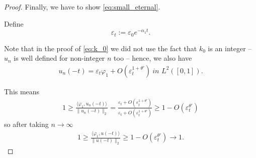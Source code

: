 \documentclass{article}
\newcommand{\1}[1]{{\mathds{1}}_{\left\{#1\right\}}}
\begin{document}
\begin{proof}
	Finally, we have to show \eqref{eq:small_eternal}. 
	
	Define
	$$\varepsilon_t:=\varepsilon_0e^{-\alpha_1 t}. $$
	
	Note that in the proof of \eqref{eq:k_0} we did not use the fact that $k_0$ is an integer -- $u_n$ is well defined for non-integer $n$ too -- hence, we also have
	\begin{align*}
		u_n(-t)=\varepsilon_t \varphi_1+O \left(\varepsilon_t^{1+\theta'} \right)  \ \textit {in } L^2([0,1]).
	\end{align*}

	This means
	\begin{align*}
		1 \geq \frac{\langle \varphi_1, u_n(-t) \rangle}{\|u_n(-t) \|_2}=\frac{\varepsilon_t+O \left(\varepsilon_t^{1+\theta'} \right)}{\varepsilon_t+O \left(\varepsilon_t^{1+\theta'} \right)} \geq 1-O \left(\varepsilon_{t}^{\theta'} \right)
	\end{align*}
	so after taking $n \to \infty$
	\begin{align*}
			1 \geq \frac{\langle \varphi_1, u(-t) \rangle}{\|u(-t) \|_2} \geq 1-O \left(\varepsilon_{t}^{\theta'} \right) \to 1.
	\end{align*}
\end{proof}
\end{document}
